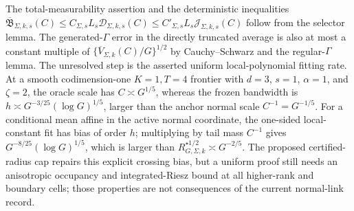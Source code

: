 The total-measurability assertion and the deterministic inequalities \(\overline{\mathfrak B}_{\Sigma,k,s}(C)\le C_{\Sigma,s}L_s\mathcal D_{\Sigma,k,s}(C)\le C'_{\Sigma,s}L_s\mathcal J_{\Sigma,k,s}(C)\) follow from the selector lemma. The generated-\(\Gamma\) error in the directly truncated average is also at most a constant multiple of \(\{\overline V_{\Sigma,k}(C)/G\}^{1/2}\) by Cauchy--Schwarz and the regular-\(\Gamma\) lemma. The unresolved step is the asserted uniform local-polynomial fitting rate. At a smooth codimension-one \(K=1,T=4\) frontier with \(d=3\), \(s=1\), \(\alpha=1\), and \(\zeta=2\), the oracle scale has \(C\asymp G^{1/5}\), whereas the frozen bandwidth is \(h\asymp G^{-3/25}(\log G)^{1/5}\), larger than the anchor normal scale \(C^{-1}=G^{-1/5}\). For a conditional mean affine in the active normal coordinate, the one-sided local-constant fit has bias of order \(h\); multiplying by tail mass \(C^{-1}\) gives \(G^{-8/25}(\log G)^{1/5}\), which is larger than \(R_{G,\Sigma,k}^{\star 1/2}\asymp G^{-2/5}\). The proposed certified-radius cap repairs this explicit crossing bias, but a uniform proof still needs an anisotropic occupancy and integrated-Riesz bound at all higher-rank and boundary cells; those properties are not consequences of the current normal-link record.